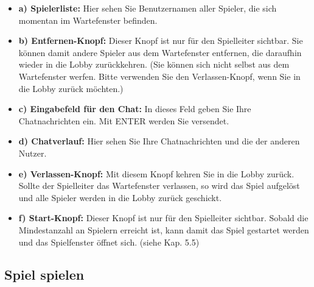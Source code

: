 \documentclass[titlepage,10pt,a4paper]{article}
\begin{document}
\begin{itemize}
	\item \textbf{a) Spielerliste:} Hier sehen Sie Benutzernamen aller Spieler, die sich momentan im \gls{Wartefenster} befinden.
	\item \textbf{b) Entfernen-Knopf:} Dieser Knopf ist nur für den Spielleiter sichtbar. Sie können damit andere Spieler aus dem \gls{Wartefenster} entfernen, die daraufhin wieder in die \gls{Lobby} zurückkehren. (Sie können sich nicht selbst aus dem \gls{Wartefenster} werfen. Bitte verwenden Sie den Verlassen-Knopf, wenn Sie in die \gls{Lobby} zurück möchten.)
	\item \textbf{c) Eingabefeld für den Chat:} In dieses Feld geben Sie Ihre Chatnachrichten ein. Mit ENTER werden Sie versendet.
	\item \textbf{d) Chatverlauf:} Hier sehen Sie Ihre Chatnachrichten und die der anderen Nutzer.
	\item \textbf{e) Verlassen-Knopf:} Mit diesem Knopf kehren Sie in die \gls{Lobby} zurück. Sollte der \gls{Spielleiter} das \gls{Wartefenster} verlassen, so wird das Spiel aufgelöst und alle Spieler werden in die Lobby zurück geschickt.
	\item \textbf{f) Start-Knopf:} Dieser Knopf ist nur für den \gls{Spielleiter} sichtbar. Sobald die Mindestanzahl an Spielern erreicht ist, kann damit das Spiel gestartet werden und das Spielfenster öffnet sich. (siehe Kap. 5.5)
\end{itemize}

\subsection{Spiel spielen}
\end{document}
